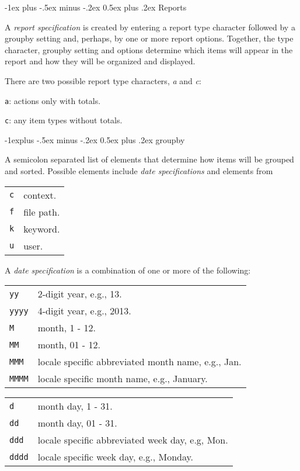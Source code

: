 \documentclass[9pt,landscape]{article}
\makeatletter
\renewcommand{\section}{\@startsection{section}{1}{0mm}%
                                {-1ex plus -.5ex minus -.2ex}%
                                {0.5ex plus .2ex}%
                                {\normalfont\large\bfseries}}
\renewcommand{\subsection}{\@startsection{subsection}{2}{0mm}%
                                {-1explus -.5ex minus -.2ex}%
                                {0.5ex plus .2ex}%
                                {\normalfont\normalsize\bfseries}}
\makeatother
\begin{document}
\begin{multicols}{3}
\section{Reports}

A \emph{report specification} is created by entering a report type character followed by a groupby setting and, perhaps, by one or more report options. Together, the type character, groupby setting and options determine which items will appear in the report and how they will be organized and displayed.

\vskip 3pt
There are two possible report type characters, \emph{a} and \emph{c}:

\begin{compactdesc}
\item[\texttt{a}:] actions only with totals.
\item[\texttt{c}:] any item types without totals.
\end{compactdesc}

\subsection{groupby}

A semicolon separated list of elements that determine how items will be grouped and sorted. Possible elements include \emph{date specifications} and elements from

\begin{tabular}{@{}ll@{}}
\texttt{c} & context. \\
\texttt{f} & file path. \\
\texttt{k} & keyword. \\
\texttt{u} & user. \\
\end{tabular}

\vskip3pt
A \emph{date specification} is a combination of one or more of the following:
\vskip3pt

\begin{tabular}{@{}ll@{}}
\texttt{yy} & 2-digit year, e.g., 13. \\
\texttt{yyyy} & 4-digit year, e.g., 2013. \\
\texttt{M} & month, 1 - 12. \\
\texttt{MM} & month, 01 - 12. \\
\texttt{MMM} & locale specific abbreviated month name, e.g., Jan. \\
\texttt{MMMM} & locale specific month name, e.g., January. \\
\end{tabular}
\begin{tabular}{@{}ll@{}}
\texttt{d} & month day, 1 - 31. \\
\texttt{dd} & month day, 01 - 31. \\
\texttt{ddd} & locale specific abbreviated week day, e.g, Mon. \\
\texttt{dddd} & locale specific week day, e.g., Monday. \\
\end{tabular}


\end{multicols}
\end{document}
